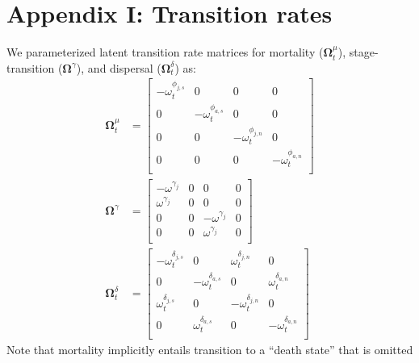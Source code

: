 \documentclass[11pt]{article}
\begin{document}
\section*{Appendix I: Transition rates} 

We parameterized latent transition rate matrices for mortality ($\boldsymbol\Omega^{\mu}_t$), 
stage-transition ($\boldsymbol\Omega^{\gamma}$), 
and dispersal ($\boldsymbol\Omega^{\delta}_t$) as:
\begin{equation} \label{eq:Theta}
\begin{aligned}
\boldsymbol\Omega^{\mu}_t & = 
\left[
\begin{array}{cc|cc}
    -\omega^{\phi_{j,s}}_t & 0 & 0 & 0 \\
    0 & -\omega^{\phi_{a,s}}_t & 0 & 0 \\
    \hline
    0 & 0 & -\omega^{\phi_{j,n}}_t & 0 \\
    0 & 0 & 0 & -\omega^{\phi_{a,n}}_t \\
    \end{array}
\right] \\
\boldsymbol\Omega^{\gamma} & = 
\left[
\begin{array}{cc|cc}
    -\omega^{\gamma_{j}} & 0 & 0 & 0 \\
    \omega^{\gamma_{j}}  & 0 & 0 & 0 \\
    \hline
    0 & 0 & -\omega^{\gamma_{j}} & 0 \\
    0 & 0 & \omega^{\gamma_{j}}  & 0 \\
    \end{array}
\right] \\
\boldsymbol\Omega^{\delta}_t & = 
\left[
\begin{array}{cc|cc}
    -\omega^{\delta_{j,s}}_t & 0 & \omega^{\delta_{j,n}}_t & 0 \\
    0 & -\omega^{\delta_{a,s}}_t & 0 & \omega^{\delta_{a,n}}_t \\
    \hline
    \omega^{\delta_{j,s}}_t & 0 & -\omega^{\delta_{j,n}}_t & 0 \\
    0 & \omega^{\delta_{a,s}}_t & 0 & -\omega^{\delta_{a,n}}_t \\
    \end{array}
\right]
\end{aligned}
\end{equation}
%
Note that mortality implicitly entails transition to a ``death state'' that is omitted 
\end{document}
